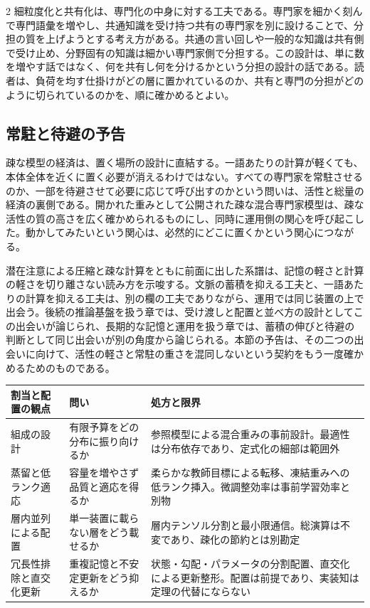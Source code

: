 \documentclass[lualatex,a4paper,10pt]{jlreq}
\begin{document}
\begin{multicols}{2}
細粒度化と共有化は、専門化の中身に対する工夫である。専門家を細かく刻んで専門語彙を増やし、共通知識を受け持つ共有の専門家を別に設けることで、分担の質を上げようとする考え方がある\autocite{deepseekmoe}。共通の言い回しや一般的な知識は共有側で受け止め、分野固有の知識は細かい専門家側で分担する。この設計は、単に数を増やす話ではなく、何を共有し何を分けるかという分担の設計の話である。読者は、負荷を均す仕掛けがどの層に置かれているのか、共有と専門の分担がどのように切られているのかを、順に確かめるとよい。

\subsection{常駐と待避の予告}
疎な模型の経済は、置く場所の設計に直結する。一語あたりの計算が軽くても、本体全体を近くに置く必要が消えるわけではない。すべての専門家を常駐させるのか、一部を待避させて必要に応じて呼び出すのかという問いは、活性と総量の経済の裏側である。開かれた重みとして公開された疎な混合専門家模型は、疎な活性の質の高さを広く確かめられるものにし、同時に運用側の関心を呼び起こした\autocite{mixtral}。動かしてみたいという関心は、必然的にどこに置くかという関心につながる。

潜在注意による圧縮と疎な計算をともに前面に出した系譜は、記憶の軽さと計算の軽さを切り離さない読み方を示唆する\autocite{deepseekv2}。文脈の蓄積を抑える工夫と、一語あたりの計算を抑える工夫は、別の欄の工夫でありながら、運用では同じ装置の上で出会う。後続の推論基盤を扱う章では、受け渡しと配置と並べ方の設計としてこの出会いが論じられ、長期的な記憶と運用を扱う章では、蓄積の伸びと待避の判断として同じ出会いが別の角度から論じられる。本節の予告は、その二つの出会いに向けて、活性の軽さと常駐の重さを混同しないという契約をもう一度確かめるためのものである。

\end{multicols}

\begin{center}
\small
\begin{tabularx}{\textwidth}{@{}p{}p{}X@{}}
\toprule
割当と配置の観点 & 問い & 処方と限界 \\
\midrule
組成の設計 & 有限予算をどの分布に振り向けるか & 参照模型による混合重みの事前設計\autocite{doremi}。最適性は分布依存であり、定式化の細部は範囲外 \\
蒸留と低ランク適応 & 容量を増やさず品質と適応を得るか & 柔らかな教師目標による転移\autocite{hinton2015}、凍結重みへの低ランク挿入\autocite{lora}。微調整効率は事前学習効率と別物 \\
層内並列による配置 & 単一装置に載らない層をどう載せるか & 層内テンソル分割と最小限通信\autocite{megatron}。総演算は不変であり、疎化の節約とは別勘定 \\
冗長性排除と直交化更新 & 重複記憶と不安定更新をどう抑えるか & 状態・勾配・パラメータの分割配置\autocite{zero}、直交化による更新整形\autocite{muon}。配置は前提であり、実装知は定理の代替にならない \\
\bottomrule
\end{tabularx}
\end{center}
\end{document}
